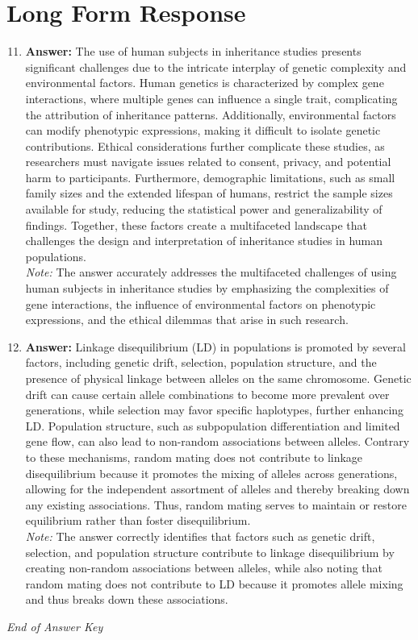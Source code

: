 \documentclass[12pt]{article}
\begin{document}
\section*{Long Form Response}
\begin{enumerate}[label=\arabic*.]
\setcounter{enumi}{10}
\item \textbf{Answer:} The use of human subjects in inheritance studies presents significant challenges due to the intricate interplay of genetic complexity and environmental factors. Human genetics is characterized by complex gene interactions, where multiple genes can influence a single trait, complicating the attribution of inheritance patterns. Additionally, environmental factors can modify phenotypic expressions, making it difficult to isolate genetic contributions. Ethical considerations further complicate these studies, as researchers must navigate issues related to consent, privacy, and potential harm to participants. Furthermore, demographic limitations, such as small family sizes and the extended lifespan of humans, restrict the sample sizes available for study, reducing the statistical power and generalizability of findings. Together, these factors create a multifaceted landscape that challenges the design and interpretation of inheritance studies in human populations.
\\ \textit{Note:} The answer accurately addresses the multifaceted challenges of using human subjects in inheritance studies by emphasizing the complexities of gene interactions, the influence of environmental factors on phenotypic expressions, and the ethical dilemmas that arise in such research.
\item \textbf{Answer:} Linkage disequilibrium (LD) in populations is promoted by several factors, including genetic drift, selection, population structure, and the presence of physical linkage between alleles on the same chromosome. Genetic drift can cause certain allele combinations to become more prevalent over generations, while selection may favor specific haplotypes, further enhancing LD. Population structure, such as subpopulation differentiation and limited gene flow, can also lead to non-random associations between alleles. Contrary to these mechanisms, random mating does not contribute to linkage disequilibrium because it promotes the mixing of alleles across generations, allowing for the independent assortment of alleles and thereby breaking down any existing associations. Thus, random mating serves to maintain or restore equilibrium rather than foster disequilibrium.
\\ \textit{Note:} The answer correctly identifies that factors such as genetic drift, selection, and population structure contribute to linkage disequilibrium by creating non-random associations between alleles, while also noting that random mating does not contribute to LD because it promotes allele mixing and thus breaks down these associations.
\end{enumerate}

\vfill
\noindent\textit{End of Answer Key}
\end{document}
